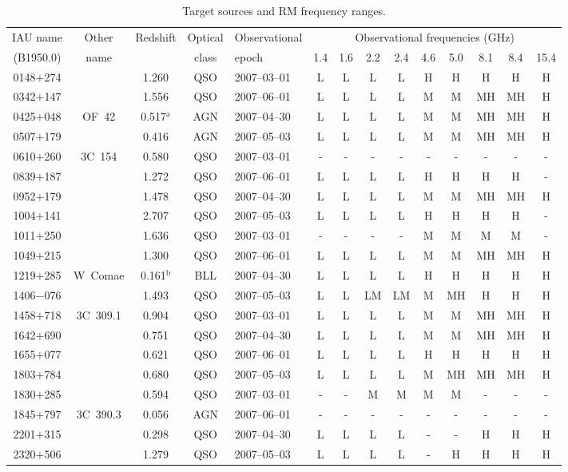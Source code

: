 \documentclass[a4paper,fleqn,usenatbib,useAMS]{mnras}
\begin{document}
\begin{table*}
 \centering
 \begin{minipage}{175mm}
  \caption{Target sources and RM frequency ranges.}
\begin{tabular}{@{}cccclccccccccc@{}}
  \hline
    IAU name & Other & Redshift & Optical & Observational & \multicolumn{9}{c}{Observational frequencies (GHz)} \\
   (B1950.0) & name & & class & epoch &1.4&1.6&2.2&2.4&4.6&5.0&8.1&8.4&15.4 \\
 \hline
 0148$+$274  & & 1.260 &   QSO  & 2007--03--01&L&L&L&L&H&H&H&H&H\\
 0342$+$147 && 1.556 &   QSO  & 2007--06--01 &L&L&L&L&M&M&MH&MH&H\\
 0425$+$048 &OF~42& 0.517$^\mathrm{a}$ &   AGN  & 2007--04--30 &L&L&L&L&M&M&MH&MH&H\\
 0507$+$179 && 0.416 &   AGN  & 2007--05--03    &L&L&L&L&M&M&MH&MH&H\\
 0610$+$260 & 3C~154 & 0.580 &   QSO  & 2007--03--01  &-&-&-&-&-&-&-&-&-\\
 0839$+$187 && 1.272 &   QSO  & 2007--06--01   &L&L&L&L&H&H&H&H&-\\
 0952$+$179 && 1.478 &   QSO  & 2007--04--30 &L&L&L&L&M&M&MH&MH&H\\
 1004$+$141 && 2.707 &   QSO  & 2007--05--03    &L&L&L&L&H&H&H&H&-\\
 1011$+$250 && 1.636 &   QSO  & 2007--03--01 &-&-&-&-&M&M&M&M&-\\
 1049$+$215 && 1.300 &   QSO  & 2007--06--01   &L&L&L&L&M&M&MH&MH&H\\
 1219$+$285 &W~Comae& 0.161$^\mathrm{b}$ & BLL & 2007--04--30 &L&L&L&L&H&H&H&H&H\\
 1406$-$076 && 1.493 &   QSO  & 2007--05--03   &L&L&LM&LM&M&MH&H&H&H\\
 1458$+$718 &3C~309.1& 0.904 &   QSO  & 2007--03--01  &L&L&L&L&M&M&MH&MH&H\\
 1642$+$690 && 0.751 &   QSO  & 2007--04--30 &L&L&L&L&M&M&MH&MH&H\\
 1655$+$077 && 0.621 &   QSO  & 2007--06--01  &L&L&L&L&H&H&H&H&H\\
 1803$+$784 && 0.680 &   QSO  & 2007--05--03   &L&L&L&L&M&MH&MH&MH&H\\
 1830$+$285 && 0.594 &   QSO  & 2007--03--01  &-&-&M&M&M&M&-&-&-\\
 1845$+$797 &3C~390.3& 0.056 &   AGN  & 2007--06--01  &-&-&-&-&-&-&-&-&-\\
 2201$+$315 && 0.298 &   QSO  & 2007--04--30 &L&L&L&L&-&-&H&H&H\\
 2320$+$506 && 1.279 &   QSO  & 2007--05--03   &L&L&L&L&-&H&H&H&H\\
\hline
\end{tabular}
\medskip


\end{minipage}
\end{table*}
\end{document}

